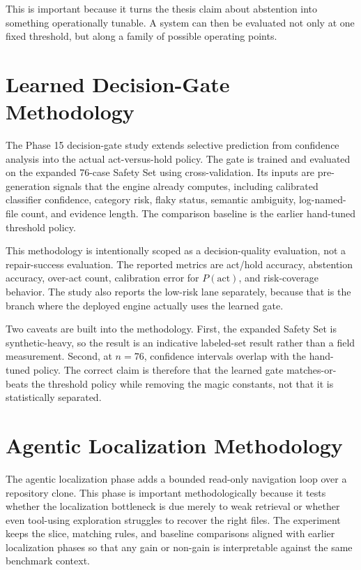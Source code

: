 This is important because it turns the thesis claim about abstention into something operationally tunable. A
system can then be evaluated not only at one fixed threshold, but along a family of possible operating points.

\section{Learned Decision-Gate Methodology}

The Phase 15 decision-gate study extends selective prediction from confidence analysis into the actual
act-versus-hold policy. The gate is trained and evaluated on the expanded 76-case Safety Set using
cross-validation. Its inputs are pre-generation signals that the engine already computes, including calibrated
classifier confidence, category risk, flaky status, semantic ambiguity, log-named-file count, and evidence
length. The comparison baseline is the earlier hand-tuned threshold policy.

This methodology is intentionally scoped as a decision-quality evaluation, not a repair-success evaluation. The
reported metrics are act/hold accuracy, abstention accuracy, over-act count, calibration error for
\(P(\mathrm{act})\), and risk-coverage behavior. The study also reports the low-risk lane separately, because
that is the branch where the deployed engine actually uses the learned gate.

Two caveats are built into the methodology. First, the expanded Safety Set is synthetic-heavy, so the result is
an indicative labeled-set result rather than a field measurement. Second, at \(n=76\), confidence intervals
overlap with the hand-tuned policy. The correct claim is therefore that the learned gate matches-or-beats the
threshold policy while removing the magic constants, not that it is statistically separated.

\section{Agentic Localization Methodology}

The agentic localization phase adds a bounded read-only navigation loop over a repository clone. This phase is
important methodologically because it tests whether the localization bottleneck is due merely to weak retrieval
or whether even tool-using exploration struggles to recover the right files. The experiment keeps the slice,
matching rules, and baseline comparisons aligned with earlier localization phases so that any gain or non-gain
is interpretable against the same benchmark context.


